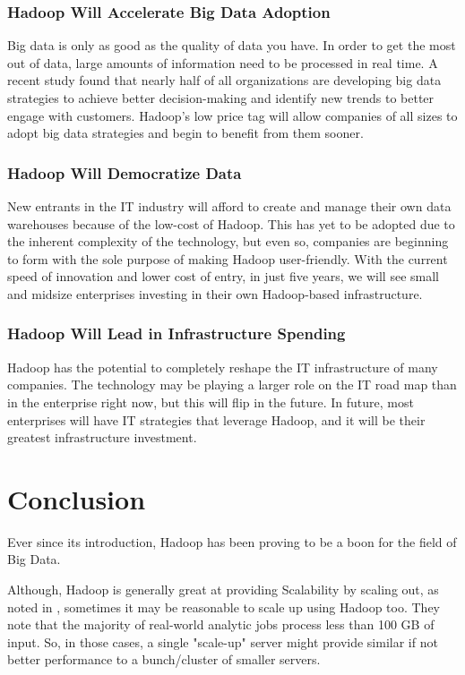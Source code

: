 \documentclass[a4paper,12pt,oneside]{report}
\begin{document}
\subsubsection{Hadoop Will Accelerate Big Data Adoption}
Big data is only as good as the quality of data you have. In order to get the most out of data, large amounts of information need to be processed in real time. A recent study found that nearly half of all organizations are developing big data strategies to achieve better decision-making and identify new trends to better engage with customers. Hadoop's low price tag will allow companies of all sizes to adopt big data strategies and begin to benefit from them sooner.

\subsubsection{Hadoop Will Democratize Data}
New entrants in the IT industry will afford to create and manage their own data warehouses because of the low-cost of Hadoop. This has yet to be adopted due to the inherent complexity of the technology, but even so, companies are beginning to form with the sole purpose of making Hadoop user-friendly. With the current speed of innovation and lower cost of entry, in just five years, we will see small and midsize enterprises investing in their own Hadoop-based infrastructure.

\subsubsection{Hadoop Will Lead in Infrastructure Spending}
Hadoop has the potential to completely reshape the IT infrastructure of many companies. The technology may be playing a larger role on the IT road map than in the enterprise right now, but this will flip in the future. In future, most enterprises will have IT strategies that leverage Hadoop, and it will be their greatest infrastructure investment.

\section{Conclusion}

Ever since its introduction, Hadoop has been proving to be a boon for the field of Big Data. 

Although, Hadoop is generally great at providing Scalability by scaling out, as noted in \cite{Appuswamy2013}, sometimes it may be 
reasonable to scale up using Hadoop too. They note that the majority of real-world analytic jobs process less than 100 GB of input. 
So, in those cases, a single "scale-up" server might provide similar if not better performance to a bunch/cluster of smaller servers.
\end{document}
